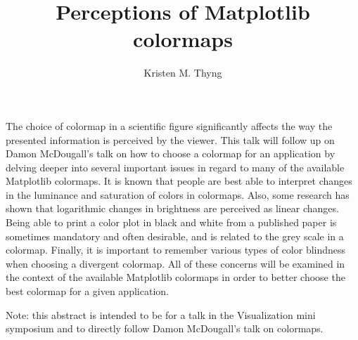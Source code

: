 \documentclass[11pt]{article}
\title{Perceptions of Matplotlib colormaps}
\author{Kristen M. Thyng}
\date{}
\begin{document}
\maketitle

The choice of colormap in a scientific figure significantly affects the way the presented information is perceived by the viewer. This talk will follow up on Damon McDougall's talk on how to choose a colormap for an  application by delving deeper into several important issues in regard to many of the available Matplotlib colormaps. It is known that people are best able to interpret changes in the luminance and saturation of colors in colormaps. Also, some research has shown that logarithmic changes in brightness are perceived as linear changes. Being able to print a color plot in black and white from a published paper is sometimes mandatory and often desirable, and is related to the grey scale in a colormap. Finally, it is important to remember various types of color blindness when choosing a divergent colormap. All of these concerns will be examined in the context of the available Matplotlib colormaps in order to better choose the best colormap for a given application.


Note: this abstract is intended to be for a talk in the Visualization mini symposium and to directly follow Damon McDougall's talk on colormaps.
\end{document}
